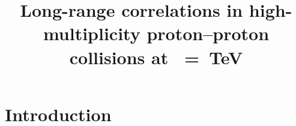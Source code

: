 \documentclass[ALICE,manyauthors]{cernphprep}
\begin{document}
%

\begin{titlepage}

\PHyear{}
\PHdate{\today}
%

\title{Long-range correlations  in high-multiplicity  proton--proton collisions  at \s~=~\unit[13]{TeV}}


\begin{abstract}

\end{abstract}
\end{titlepage}
\setcounter{page}{2}

\section{Introduction}
\end{document}
